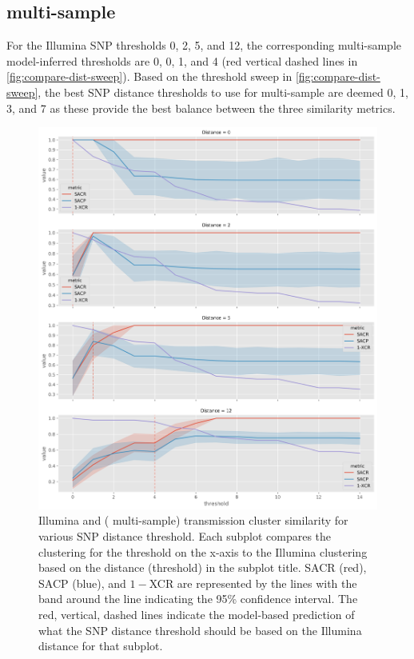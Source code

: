 \subsection{\pandora{} multi-sample}

For the Illumina SNP thresholds 0, 2, 5, and 12, the corresponding \pandora{} multi-sample model-inferred thresholds are 0, 0, 1, and 4 (red vertical dashed lines in \autoref{fig:compare-dist-sweep}). Based on the threshold sweep in \autoref{fig:compare-dist-sweep}, the best SNP distance thresholds to use for \pandora{} multi-sample are deemed 0, 1, 3, and 7 as these provide the best balance between the three similarity metrics.

\begin{figure}
\begin{center}
\includegraphics[width=0.90\columnwidth]{Appendix1/Figs/compare-threshold-sweep.png}
\caption{{Illumina and \ont{} (\pandora{} multi-sample) transmission cluster similarity for various SNP distance threshold. Each subplot compares the \ont{} clustering for the threshold on the x-axis to the Illumina clustering based on the distance (threshold) in the subplot title. SACR (red), SACP (blue), and $1-$XCR are represented by the lines with the band around the line indicating the 95\% confidence interval. The red, vertical, dashed lines indicate the model-based prediction of what the \ont{} SNP distance threshold should be based on the Illumina distance for that subplot.
{\label{fig:compare-dist-sweep}}%
}}
\end{center}
\end{figure}

